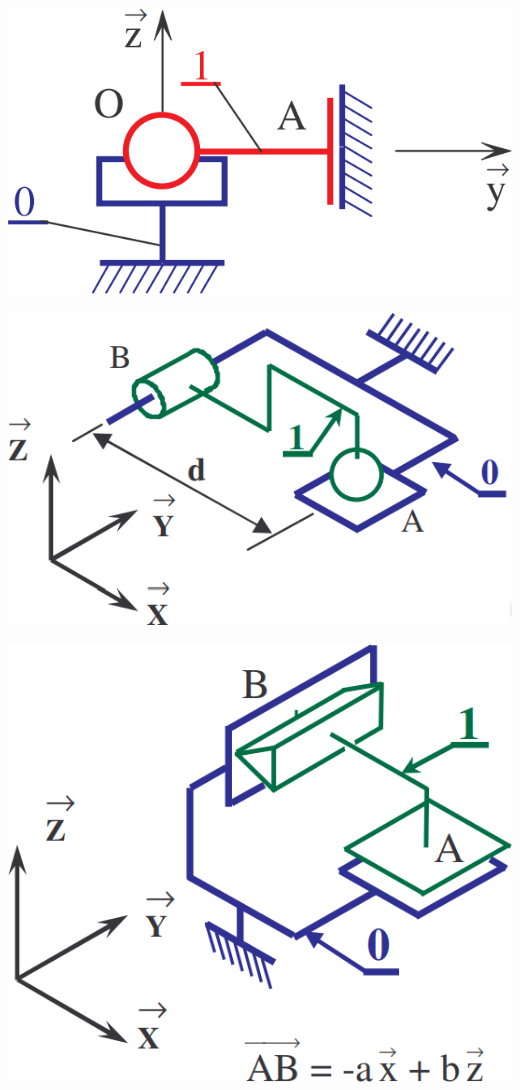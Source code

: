 \documentclass[10pt,fleqn]{article} %
\begin{document}
\begin{multicols}{2}
\begin{multicols}{2}
\begin{center}
\includegraphics[width=.8\linewidth]{images/fig_06.png}
\end{center}

\begin{center}
\includegraphics[width=.8\linewidth]{images/fig_07.png}
\end{center}

\begin{center}
\includegraphics[width=.8\linewidth]{images/fig_08.png}
\end{center}


\end{multicols}
\end{multicols}
\end{document}
